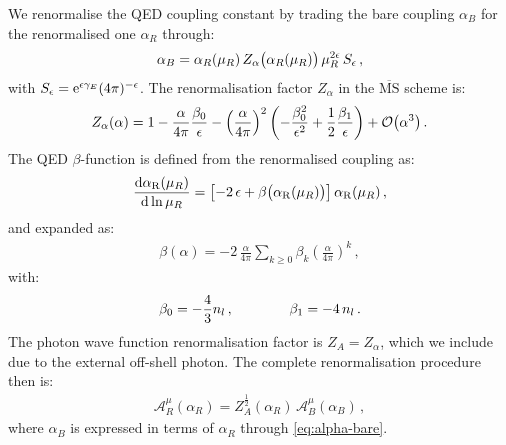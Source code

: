 \documentclass[main.tex]{subfiles}
\begin{document}
We renormalise the QED coupling constant by trading the bare coupling $\alpha_B$ for the renormalised one $\alpha_R$ through:
\begin{align}
    \label{eq:alpha-bare}
    \alpha_B = \alpha_R(\mu_R) \, Z_{\alpha}\bigl(\alpha_R(\mu_R) \bigr)  \, \mu_R^{2 \epsilon} \, S_{\epsilon} \,,
\end{align}
with $S_\epsilon= \mathrm{e}^{\epsilon\gamma_E} (4\pi)^{-\epsilon}$.
The renormalisation factor $Z_{\alpha}$ in the $\overline{\text{MS}}$ scheme is: \cite{Barnreuther:2013qvf,Bonciani:2021okt}
\begin{align}
    \label{eq:Za}
    Z_{\alpha}(\alpha) = 1 - \frac{\alpha}{4 \pi} \frac{\beta_0}{\epsilon} -
    \left(\frac{\alpha}{4 \pi}\right)^2 \left( -\frac{\beta_0^2}{\epsilon^2} + \frac{1}{2}\frac{\beta_1}{\epsilon} \right) + \mathcal{O}\bigl(\alpha^3\bigr) \,.
\end{align}
The QED $\beta$-function is defined from the renormalised coupling as:
\begin{align} \label{eq:beta_func_def}
\frac{\mathrm{d} \alpha_{\rm R}(\mu_R)}{\mathrm{d} \ln \mu_R} = \left[ -2 \, \epsilon + \beta\bigl(\alpha_{\rm R}(\mu_R)\bigr) \right]  \alpha_{\rm R}(\mu_R) \,,
\end{align}
and expanded as:
\begin{align} \label{eq:beta_func}
\beta( \alpha ) = -2 \, \frac{\alpha}{4 \pi}  \sum_{k\ge 0} \beta_k \left(\frac{\alpha}{4\pi} \right)^k \,,
\end{align}
with:
\begin{align} \label{eq:beta_coeffs}
\beta_0 = -\frac{4}{3} n_l \,, \qquad \qquad \beta_1 = - 4 \, n_l \,.
\end{align}
The photon wave function renormalisation factor is $Z_A=Z_\alpha$, which we include due to the external off-shell photon. The complete renormalisation procedure then is:
\begin{align}
    \mathcal{A}^\mu_R (\alpha_R) = Z_A^{\frac{1}{2}}(\alpha_R) \, \mathcal{A}^\mu_B (\alpha_B) \, ,
\end{align}
where $\alpha_B$ is expressed in terms of $\alpha_R$ through \cref{eq:alpha-bare}.
\end{document}
